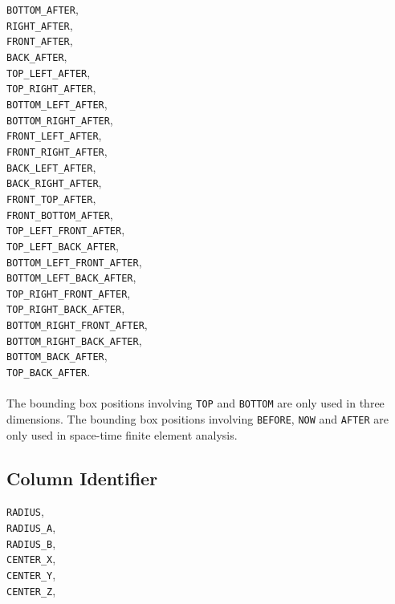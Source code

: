\documentclass[10pt]{article}
\begin{document}
	\verb+BOTTOM_AFTER+,\\
	\verb+RIGHT_AFTER+,\\
	\verb+FRONT_AFTER+,\\
	\verb+BACK_AFTER+,\\
	\verb+TOP_LEFT_AFTER+,\\
	\verb+TOP_RIGHT_AFTER+,\\
	\verb+BOTTOM_LEFT_AFTER+,\\
	\verb+BOTTOM_RIGHT_AFTER+,\\
	\verb+FRONT_LEFT_AFTER+,\\
	\verb+FRONT_RIGHT_AFTER+,\\
	\verb+BACK_LEFT_AFTER+,\\
	\verb+BACK_RIGHT_AFTER+,\\
	\verb+FRONT_TOP_AFTER+,\\
	\verb+FRONT_BOTTOM_AFTER+,\\
	\verb+TOP_LEFT_FRONT_AFTER+,\\
	\verb+TOP_LEFT_BACK_AFTER+,\\
	\verb+BOTTOM_LEFT_FRONT_AFTER+,\\
	\verb+BOTTOM_LEFT_BACK_AFTER+,\\
	\verb+TOP_RIGHT_FRONT_AFTER+,\\
	\verb+TOP_RIGHT_BACK_AFTER+,\\
	\verb+BOTTOM_RIGHT_FRONT_AFTER+,\\
	\verb+BOTTOM_RIGHT_BACK_AFTER+,\\
	\verb+BOTTOM_BACK_AFTER+,\\
	\verb+TOP_BACK_AFTER+.
	
	\paragraph{} The bounding box positions involving \verb+TOP+ and \verb+BOTTOM+ are only used in three dimensions. The bounding box positions involving \verb+BEFORE+, \verb+NOW+ and \verb+AFTER+ are only used in space-time finite element analysis.

\subsection{Column Identifier}

\verb+RADIUS+,\\
\verb+RADIUS_A+,\\
\verb+RADIUS_B+,\\
\verb+CENTER_X+,\\
\verb+CENTER_Y+,\\
\verb+CENTER_Z+,
\end{document}
